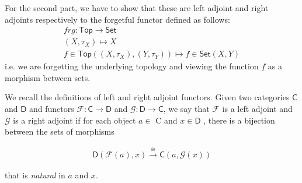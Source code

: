 \begin{frame}
    
For the second part, we have to show that these are left adjoint and right
adjoints respectively to the forgetful functor defined as follows: 
\begin{gather*}
    frg : \textsf{Top} \to \textsf{Set} \\
    (X, \tau_X ) \mapsto X \\
    f \in \textsf{Top}((X,\tau_X),(Y,\tau_Y )) \mapsto f \in \textsf{Set}(X,Y) 
\end{gather*}
i.e. we are forgetting the underlying topology and viewing the function \(f\) as a
morphism between sets. 
\end{frame}
\begin{frame}

    \begin{center}
    \end{center}
    
We recall the definitions of left and right adjoint functors. Given two
categories \(\textsf{C}\) and \(\textsf{D}\) and functors \(\mathcal{F}:
\textsf{C} \to \textsf{D}\) and \(\mathcal{G}: \textsf{D} \to \textsf{C}\), we
say that \(\mathcal{F}\) is a left adjoint and \(\mathcal{G}\) is a right
adjoint if for each object \(a \in\) \textsf{C} and \(x \in\textsf{D}\) , there
is a bijection between the sets of morphisms 

\begin{gather*}
    \textsf{D}(\mathcal{F}(a) , x) \xrightarrow{\cong} \textsf{C}(a,
    \mathcal{G}(x))
\end{gather*}

that is \textit{natural} in \(a\) and \(x\). 
\end{frame}
